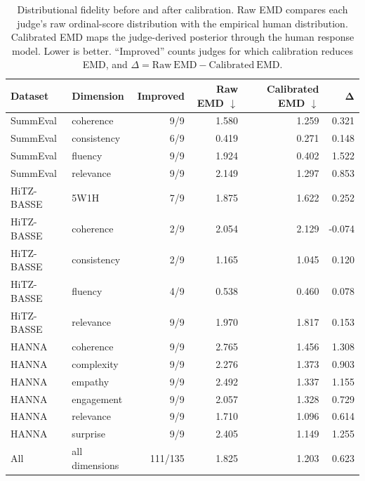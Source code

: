 \begin{table}[t]
\centering
\small
\setlength{\tabcolsep}{4pt}
\caption{
Distributional fidelity before and after calibration.
Raw EMD compares each judge's raw ordinal-score distribution
with the empirical human distribution. Calibrated EMD maps the
judge-derived posterior through the human response model.
Lower is better. ``Improved'' counts judges for which calibration
reduces EMD, and
$\Delta=\mathrm{Raw\ EMD}-\mathrm{Calibrated\ EMD}$.
}
\label{tab:distributional-emd}
\begin{tabular}{llrrrr}
\toprule
\textbf{Dataset}
& \textbf{Dimension}
& \textbf{Improved}
& \textbf{Raw EMD $\downarrow$}
& \textbf{Calibrated EMD $\downarrow$}
& $\boldsymbol{\Delta}$ \\
\midrule
SummEval & coherence & 9/9 & 1.580 & 1.259 & 0.321 \\
SummEval & consistency & 6/9 & 0.419 & 0.271 & 0.148 \\
SummEval & fluency & 9/9 & 1.924 & 0.402 & 1.522 \\
SummEval & relevance & 9/9 & 2.149 & 1.297 & 0.853 \\
\midrule
HiTZ-BASSE & 5W1H & 7/9 & 1.875 & 1.622 & 0.252 \\
HiTZ-BASSE & coherence & 2/9 & 2.054 & 2.129 & -0.074 \\
HiTZ-BASSE & consistency & 2/9 & 1.165 & 1.045 & 0.120 \\
HiTZ-BASSE & fluency & 4/9 & 0.538 & 0.460 & 0.078 \\
HiTZ-BASSE & relevance & 9/9 & 1.970 & 1.817 & 0.153 \\
\midrule
HANNA & coherence & 9/9 & 2.765 & 1.456 & 1.308 \\
HANNA & complexity & 9/9 & 2.276 & 1.373 & 0.903 \\
HANNA & empathy & 9/9 & 2.492 & 1.337 & 1.155 \\
HANNA & engagement & 9/9 & 2.057 & 1.328 & 0.729 \\
HANNA & relevance & 9/9 & 1.710 & 1.096 & 0.614 \\
HANNA & surprise & 9/9 & 2.405 & 1.149 & 1.255 \\
\midrule
All & all dimensions & 111/135 & 1.825 & 1.203 & 0.623 \\
\bottomrule
\end{tabular}
\end{table}
